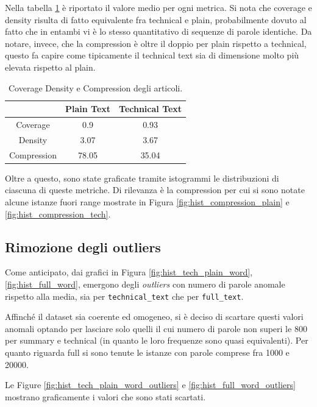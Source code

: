 \documentclass[12pt,a4paper,twoside,openright]{book}
\begin{document}
Nella tabella \ref{tab:cov_dens_compr} è riportato il valore medio per ogni metrica. Si nota che coverage e density risulta di fatto equivalente fra technical e plain, probabilmente dovuto al fatto che in entambi vi è lo stesso quantitativo di sequenze di parole identiche. Da notare, invece, che la compression è oltre il doppio per plain rispetto a technical, questo fa capire come tipicamente il technical text sia di dimensione molto più elevata rispetto al plain.


\begin{table}
\centering
\begin{tabular}{|c|c|c|}
\hline
            & Plain Text & Technical Text \\ \hline
Coverage    & 0.9        & 0.93           \\ \hline
Density     & 3.07       & 3.67           \\ \hline
Compression & 78.05      & 35.04          \\ \hline
\end{tabular}
\caption{Coverage Density e Compression degli articoli.}
\label{tab:cov_dens_compr}
\end{table}


Oltre a questo, sono state graficate tramite istogrammi le distribuzioni di ciascuna di queste metriche. Di rilevanza è la compression per cui si sono notate alcune istanze fuori range mostrate in Figura \ref{fig:hist_compression_plain} e \ref{fig:hist_compression_tech}.




\subsection{Rimozione degli outliers}
Come anticipato, dai grafici in Figura \ref{fig:hist_tech_plain_word}, \ref{fig:hist_full_word}, emergono degli \emph{outliers} con numero di parole anomale rispetto alla media, sia per \texttt{technical\_text} che per \texttt{full\_text}. 

Affinché il dataset sia coerente ed omogeneo, si è deciso di scartare questi valori anomali optando per lasciare solo quelli il cui numero di parole non superi le 800 per summary e technical (in quanto le loro frequenze sono quasi equivalenti). Per quanto riguarda full si sono tenute le istanze con parole comprese fra 1000 e 20000.

Le Figure \ref{fig:hist_tech_plain_word_outliers} e \ref{fig:hist_full_word_outliers} mostrano graficamente i valori che sono stati scartati.
\end{document}
